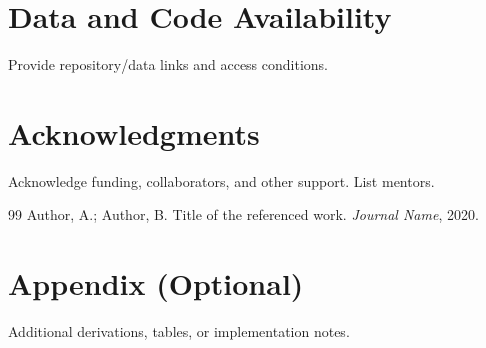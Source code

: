 \documentclass[11pt]{article}
\begin{document}
\section*{Data and Code Availability}
Provide repository/data links and access conditions.

\section*{Acknowledgments}
Acknowledge funding, collaborators, and other support.
List mentors.


\begin{thebibliography}{99}
Author, A.; Author, B.
\newblock Title of the referenced work.
\newblock \emph{Journal Name}, 2020.
\end{thebibliography}

\appendix
\section{Appendix (Optional)}
Additional derivations, tables, or implementation notes.
\end{document}
